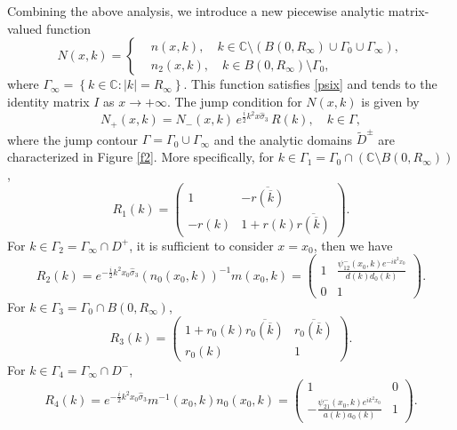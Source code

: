 \documentclass[preprint,compress,12pt]{elsarticle}
\numberwithin{equation}{section}
\begin{document}
Combining the above analysis, we introduce a new piecewise analytic matrix-valued function
\begin{equation}\label{ahkf}
N(x,k)=\left\{
\begin{aligned}
&n(x,k),\quad k\in\mathbb{C} \setminus\left(B(0,R_{\infty})\cup\Gamma_{0}\cup\Gamma_{\infty}\right),\\
&n_{2}(x,k),\quad k\in B(0,R_{\infty})\setminus\Gamma_{0},
\end{aligned}
\right.
\end{equation}
where $\Gamma_{\infty}=\left\{k\in\mathbb{C}:|k|=R_{\infty}\right\}$. This function satisfies \eqref{psix} and tends to the identity matrix $I$ as  $x\rightarrow +\infty$.  The jump condition for $N(x,k)$ is given by
\begin{equation}\label{juv}
N_{+}(x,k)=N_{-}(x,k)\,e^{\frac{i}{2}k^{2}x\widehat{\sigma}_{3}}\,R(k),\quad k\in\Gamma,
\end{equation}
where the jump contour $\Gamma=\Gamma_{0}\cup\Gamma_{\infty}$ and the analytic domains $\widetilde{D}^{\pm}$ are characterized in Figure \ref{f2}. More specifically,
for $k\in\Gamma_{1}=\Gamma_{0}\cap(\mathbb{C}\setminus B(0,R_{\infty}))$,
  \begin{equation}\label{v1}
  R_{1}(k)=\begin{pmatrix}1&-\overline{r(\overline{k})}\\-r(k)&1+r(k)\overline{r(\overline{k})}\end{pmatrix}.
  \end{equation}
For $k\in\Gamma_{2}=\Gamma_{\infty}\cap D^{+}$, it is
sufficient to consider $x=x_{0}$, then we have
  \begin{equation}\label{v2}
R_{2}(k)=e^{-\frac{i}{2}k^{2}x_{0}\widehat{\sigma}_{3}}\left(n_{0}(x_{0},k)\right)^{-1}m(x_{0},k)=\begin{pmatrix}1&\frac{\psi_{12}^{-}(x_{0},k)e^{-ik^{2}x_{0}}}{d(k)d_{0}(k)}\\0&1\end{pmatrix}.
\end{equation}
For $k\in\Gamma_{3}=\Gamma_{0}\cap B(0,R_{\infty})$,
  \begin{equation}\label{v3}
  R_{3}(k)=\begin{pmatrix}1+r_{0}(k)\overline{r_{0}(\overline{k})}&\overline{r_{0}(\overline{k})}\\r_{0}(k)&1\end{pmatrix}.
  \end{equation}
For $k\in\Gamma_{4}=\Gamma_{\infty}\cap D^{-}$,
\begin{equation}\label{v4}
R_{4}(k)=e^{-\frac{i}{2}k^{2}x_{0}\widehat{\sigma}_{3}}m^{-1}(x_{0},k)n_{0}(x_{0},k)=\begin{pmatrix}1&0\\-\frac{\psi_{21}^{-}(x_{0},k)e^{ik^{2}x_{0}}}{a(k)a_{0}(k)}&1\end{pmatrix}.
\end{equation}
\end{document}
